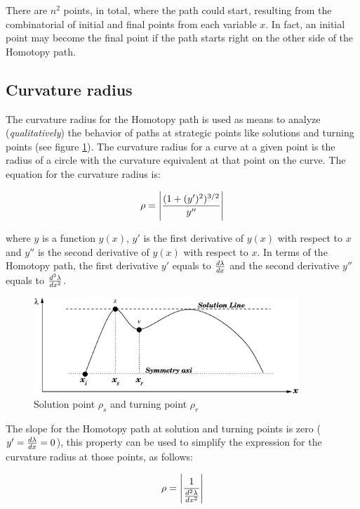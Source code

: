 \documentclass[journal,twocolumn]{IEEEtran}
\begin{document}
There are $n^2$ points, in total, where the path could start, resulting from the combinatorial of initial and final points from each variable $x$. In fact, an initial point may become the final point if the path starts right on the other side of the Homotopy path.

\subsection{Curvature radius}

The curvature radius for the Homotopy path is used as means to analyze ({\it qualitatively}) the behavior of paths at strategic points like solutions and turning points (see figure \ref{radio1}). The curvature radius for a curve at a given point is the radius of a circle with the curvature equivalent at that point on the curve. The equation for the curvature radius is:

\begin{displaymath}
\rho=  \Bigg |{{(1 + (y')^2)^{3/2}} \over {y''}} \Bigg |
\end{displaymath}

where $y$ is a function $y(x)$, $y'$ is the first derivative of $y(x)$ with respect to $x$ and $y''$ is the second derivative of $y(x)$ with respect to $x$. In terms of the Homotopy path, the first derivative $y'$ equals to ${ {d \lambda} \over {dx}}$ and the second derivative $y''$ equals to ${ {d^2 \lambda} \over {dx^2}}$.

\begin{figure}[tbp]
\centering
\includegraphics[width=10cm]{nh3figs/radiob.eps}
\caption{Solution point $\rho_s$ and turning point $\rho_r$}
\label{radio1}
\end{figure}

The slope for the Homotopy path at solution and turning points is zero ($y'={ {d \lambda} \over {dx}} =0$), this property can be used to simplify the expression for the curvature radius at those points, as follows:

\begin{displaymath}
\rho= \Bigg | {1 \over {{ {d^2 \lambda} \over {dx^2}}}} \Bigg |
\end{displaymath}
\end{document}

